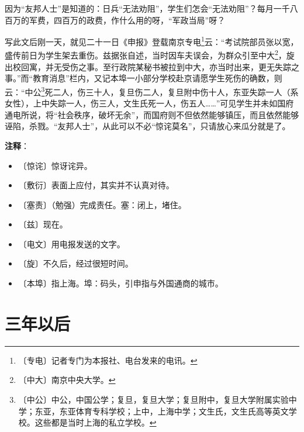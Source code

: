 \documentclass[12pt,UTF-8,openany]{ctexbook}
\begin{document}
\begin{large}
    因为“友邦人士”是知道的：日兵“无法劝阻”，学生们怎会“无法劝阻”？每月一千八百万的军费，四百万的政费，作什么用的呀，“军政当局”呀？
    
    写此文后刚一天，就见二十一日《申报》登载南京专电\footnote{〔专电〕记者专门为本报社、电台发来的电讯。}云：“考试院部员张以宽，盛传前日为学生架去重伤。兹据张自述，当时因车夫误会，为群众引至中大\footnote{〔中大〕南京中央大学。}，旋出校回寓，并无受伤之事。至行政院某秘书被拉到中大，亦当时出来，更无失踪之事。”而“教育消息”栏内，又记本埠一小部分学校赴京请愿学生死伤的确数，则云：“中公\footnote{〔中公〕中公，中国公学；复旦，复旦大学；复旦附中，复旦大学附属实验中学；东亚，东亚体育专科学校；上中，上海中学；文生氏，文生氏高等英文学校。这些都是当时上海的私立学校。}死二人，伤三十人，复旦伤二人，复旦附中伤十人，东亚失踪一人（系女性），上中失踪一人，伤三人，文生氏死一人，伤五人……”可见学生并未如国府通电所说，将“社会秩序，破坏无余”，而国府则不但依然能够镇压，而且依然能够诬陷，杀戮。“友邦人士”，从此可以不必“惊诧莫名”，只请放心来瓜分就是了。
    
\end{large}


\newpage

\textbf{注释}：

\vspace{-1em}

\begin{itemize}
    \setlength\itemsep{-0.2em}
    \item 〔惊诧〕惊讶诧异。
    \item 〔敷衍〕表面上应付，其实并不认真对待。
    \item 〔塞责〕（勉强）完成责任。塞：闭上，堵住。
    \item 〔兹〕现在。
    \item 〔电文〕用电报发送的文字。
    \item 〔旋〕不久后，经过很短时间。
    \item 〔本埠〕指上海。埠：码头，引申指与外国通商的城市。
\end{itemize}

\chapter{三年以后}
\end{document}
